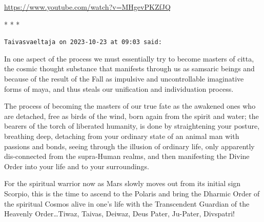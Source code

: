 \url{https://www.youtube.com/watch?v=MHgevPKZfJQ}




\begin{center}* * *\end{center}

\begin{footnotesize}\begin{sffamily}



\texttt{Taivasvaeltaja on 2023-10-23 at 09:03 said: }

In one aspect of the process we must essentially try to become masters of citta, the cosmic thought substance that manifests through us as samsaric beings and because of the result of the Fall as impulsive and uncontrollable imaginative forms of maya, and thus steals our unification and individuation process.

The process of becoming the masters of our true fate as the awakened ones who are detached, free as birds of the wind, born again from the spirit and water; the bearers of the torch of liberated humanity, is done by straightening your posture, breathing deep, detaching from your ordinary state of an animal man with passions and bonds, seeing through the illusion of ordinary life, only apparently dis-connected from the supra-Human realms, and then manifesting the Divine Order into your life and to your surroundings.

For the spiritual warrior now as Mars slowly moves out from its initial sign Scorpio, this is the time to ascend to the Polaris and bring the Dharmic Order of the spiritual Cosmos alive in one's life with the Transcendent Guardian of the Heavenly Order…Tiwaz, Taivas, Deiwaz, Deus Pater, Ju-Pater, Divspatri!


\end{sffamily}\end{footnotesize}
